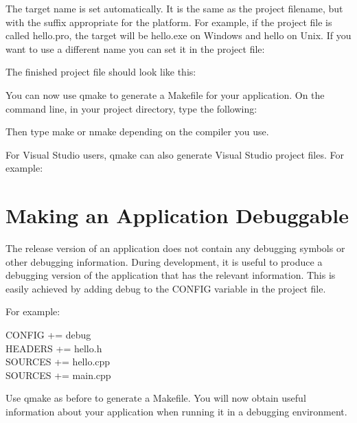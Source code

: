 The target name is set automatically. It is the same as the project filename, but with the suffix appropriate for the platform. For example, if the project file is called hello.pro, the target will be hello.exe on Windows and hello on Unix. If you want to use a different name you can set it in the
project file:
\begin{center}
  {\color{seagreen}{TARGET = helloworld}}
\end{center}
The finished project file should look like this:
\begin{center}
  {\color{seagreen}{HEADERS += hello.h\\
      SOURCES += hello.cpp\\
      SOURCES += main.cpp}}
\end{center}
You can now use qmake to generate a Makefile for your application. On the command line, in your project directory, type the following:
\begin{center}
  {\color{seagreen}{qmake -o Makefile hello.pro}}
\end{center}
Then type make or nmake depending on the compiler you use.
\par
For Visual Studio users, qmake can also generate Visual Studio project files. For example:
\begin{center}
  {\color{seagreen}{qmake -tp vc hello.pro}}
\end{center}

\section{Making an Application Debuggable}
The release version of an application does not contain any debugging symbols or other debugging information. During development, it is useful to produce a debugging version of the application that has the relevant information. This is easily achieved by adding debug to the CONFIG variable in the
project file.
\par
For example:
\begin{center}
  \color{seagreen}
  CONFIG += debug\\
  HEADERS += hello.h\\
  SOURCES += hello.cpp\\
  SOURCES += main.cpp
\end{center}
Use qmake as before to generate a Makefile. You will now obtain useful information about your application when running it in a debugging environment.

